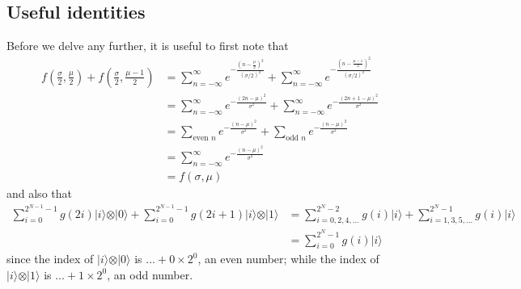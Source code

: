 \documentclass[11pt]{article}
\begin{document}
\subsection*{Useful identities}
Before we delve any further, it is useful to first note that
\begin{align}
f\left( \frac{\sigma}{2}, \frac{\mu}{2} \right) + f\left( \frac{\sigma}{2}, \frac{\mu - 1}{2} \right) &= \sum_{n=-\infty}^{\infty} e^{-\frac{(n - \frac{\mu}{2})^2}{(\sigma/2)^2}} + \sum_{n=-\infty}^{\infty} e^{-\frac{(n - \frac{\mu-1}{2})^2}{(\sigma/2)^2}} \nonumber \\
&= \sum_{n=-\infty}^{\infty} e^{-\frac{(2n - \mu)^2}{\sigma^2}} + \sum_{n=-\infty}^{\infty} e^{-\frac{(2n + 1 - \mu)^2}{\sigma^2}} \nonumber \\
&= \sum_{\text{even } n} e^{-\frac{(n - \mu)^2}{\sigma^2}} + \sum_{\text{odd } n} e^{-\frac{(n - \mu)^2}{\sigma^2}} \nonumber \\
&= \sum_{n=-\infty}^{\infty} e^{-\frac{(n - \mu)^2}{\sigma^2}} \nonumber \\
&= f(\sigma, \mu) \label{eq2}
\end{align}
and also that
\begin{align}
\sum_{i=0}^{2^{N-1} - 1} g(2i) \vert i \rangle \otimes \vert 0 \rangle + \sum_{i=0}^{2^{N-1} - 1} g(2i + 1) \vert i \rangle \otimes \vert 1 \rangle &= \sum_{i=0, 2, 4, ...}^{2^{N} - 2} g(i) \vert i \rangle + \sum_{i=1, 3, 5, ...}^{2^{N} - 1} g(i) \vert i \rangle \nonumber \\
&= \sum_{i=0}^{2^{N} - 1} g(i) \vert i \rangle \label{eq3}
\end{align}
since the index of $\vert i \rangle \otimes \vert 0 \rangle$ is $ ... + 0 \times 2^{0}$, an even number; while the index of $\vert i \rangle \otimes \vert 1 \rangle$ is $ ... + 1 \times 2^{0}$, an odd number.
\end{document}
